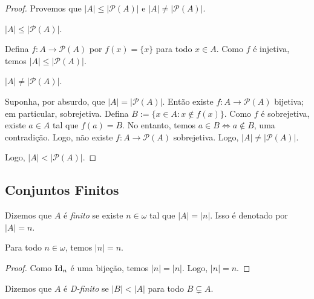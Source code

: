 \begin{proof}
    Provemos que $|A| \leq |\mathcal{P}(A)|$ e $|A| \neq |\mathcal{P}(A)|$.
        \begin{claim}
            $|A| \leq |\mathcal{P}(A)|$.
        \end{claim}
        \begin{midproof}
            Defina $f : A \to \mathcal{P}(A)$ por $f(x) = \{x\}$ para todo $x \in A$. Como $f$ é injetiva, temos $|A| \leq |\mathcal{P}(A)|$. \whiteproof
        \end{midproof}
        \begin{claim}
            $|A| \neq |\mathcal{P}(A)|$.
        \end{claim}
        \begin{midproof}
            Suponha, por absurdo, que $|A| = |\mathcal{P}(A)|$. Então existe $f : A \to \mathcal{P}(A)$ bijetiva; em particular, sobrejetiva. Defina $B := \{x \in A : x \notin f(x)\}$. Como $f$ é sobrejetiva, existe $a \in A$ tal que $f(a) = B$. No entanto, temos $a \in B \Leftrightarrow a \notin B$, uma contradição. Logo, não existe $f : A \to \mathcal{P}(A)$ sobrejetiva. Logo, $|A| \neq |\mathcal{P}(A)|$. \whiteproof 
        \end{midproof}
    Logo, $|A| < |\mathcal{P}(A)|$. \blackproof
\end{proof}

\subsection{Conjuntos Finitos}

\begin{definition}
    Dizemos que $A$ é \emph{finito} se existe $n \in \omega$ tal que $|A| = |n|$. Isso é denotado por $|A| = n$.
\end{definition}

\begin{corollary}
    Para todo $n \in \omega$, temos $|n| = n$.
\end{corollary}

\begin{proof}
    Como $\operatorname{Id}_{n}$ é uma bijeção, temos $|n| = |n|$. Logo, $|n| = n$. \blackproof
\end{proof}

\begin{definition}
    Dizemos que $A$ é \emph{D-finito} se $|B| < |A|$ para todo $B \subsetneq A$.
\end{definition}

